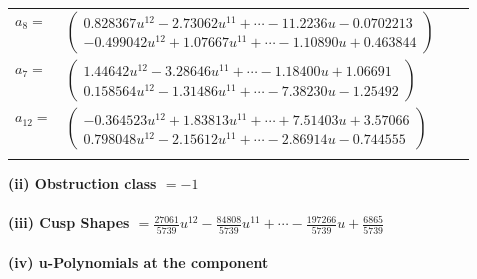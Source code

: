 \documentclass[1p]{elsarticle_modified}
\theoremstyle{definition}
\begin{document}
\begin{tabular}{m{7pt} m{180pt} m{7pt} m{180pt} }
\flushright $a_{8}=$&$\begin{pmatrix}0.828367 u^{12}-2.73062 u^{11}+\cdots-11.2236 u-0.0702213\\-0.499042 u^{12}+1.07667 u^{11}+\cdots-1.10890 u+0.463844\end{pmatrix}$ \\
\flushright $a_{7}=$&$\begin{pmatrix}1.44642 u^{12}-3.28646 u^{11}+\cdots-1.18400 u+1.06691\\0.158564 u^{12}-1.31486 u^{11}+\cdots-7.38230 u-1.25492\end{pmatrix}$ \\
\flushright $a_{12}=$&$\begin{pmatrix}-0.364523 u^{12}+1.83813 u^{11}+\cdots+7.51403 u+3.57066\\0.798048 u^{12}-2.15612 u^{11}+\cdots-2.86914 u-0.744555\end{pmatrix}$\\&\end{tabular}
\flushleft \textbf{(ii) Obstruction class $= -1$}\\~\\
\flushleft \textbf{(iii) Cusp Shapes $= \frac{27061}{5739} u^{12}-\frac{84808}{5739} u^{11}+\cdots-\frac{197266}{5739} u+\frac{6865}{5739}$}\\~\\
\newpage\renewcommand{\arraystretch}{1}
\flushleft \textbf{(iv) u-Polynomials at the component}\newline \\
\end{document}
